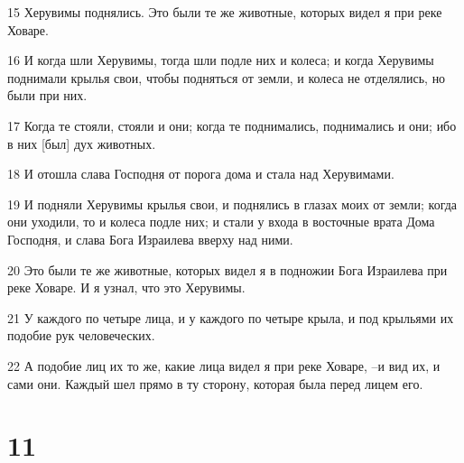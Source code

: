 \par 15 Херувимы поднялись. Это были те же животные, которых видел я при реке Ховаре.
\par 16 И когда шли Херувимы, тогда шли подле них и колеса; и когда Херувимы поднимали крылья свои, чтобы подняться от земли, и колеса не отделялись, но были при них.
\par 17 Когда те стояли, стояли и они; когда те поднимались, поднимались и они; ибо в них [был] дух животных.
\par 18 И отошла слава Господня от порога дома и стала над Херувимами.
\par 19 И подняли Херувимы крылья свои, и поднялись в глазах моих от земли; когда они уходили, то и колеса подле них; и стали у входа в восточные врата Дома Господня, и слава Бога Израилева вверху над ними.
\par 20 Это были те же животные, которых видел я в подножии Бога Израилева при реке Ховаре. И я узнал, что это Херувимы.
\par 21 У каждого по четыре лица, и у каждого по четыре крыла, и под крыльями их подобие рук человеческих.
\par 22 А подобие лиц их то же, какие лица видел я при реке Ховаре, --и вид их, и сами они. Каждый шел прямо в ту сторону, которая была перед лицем его.

\chapter{11}

